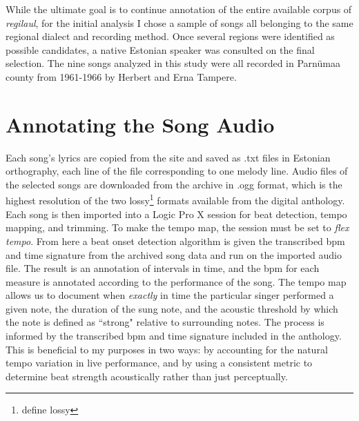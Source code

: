 While the ultimate goal is to continue annotation of the entire available corpus of {\it regilaul}, for the initial analysis I chose a sample of songs all belonging to the same regional dialect and recording method. Once several regions were identified as possible candidates, a native Estonian speaker was consulted on the final selection. The nine songs analyzed in this study were all recorded in Parnümaa county from 1961-1966 by Herbert and Erna Tampere. 


\section{Annotating the Song Audio }



 Each song's lyrics are copied from the site and saved as .txt files in Estonian orthography, each line of the file corresponding to one melody line.  
Audio files of the selected songs are downloaded from the archive in .ogg format, which is the highest resolution of the two lossy\footnote{define lossy} formats available from the digital anthology. Each song is then imported into a Logic Pro X \citep{b131156} session for beat detection, tempo mapping, and trimming. 
To make the tempo map, the session must be set to {\it flex tempo}. From here a beat onset detection algorithm \citep{robertsonBKeeperBeattrackerLive2007} is  given the transcribed bpm and time signature from the archived song data and run on the imported audio file. The result is an annotation of intervals in time, and the bpm for each measure is annotated according to the performance of the song.
The tempo map allows us to document when {\it exactly} in time the particular singer performed a given note, the duration of the sung note, and the acoustic threshold by which the note is defined as ``strong" relative to surrounding notes. The process is informed by the transcribed bpm and time signature included in the anthology. This is beneficial to my purposes in two ways: by accounting for the natural tempo variation in live performance, and by using a consistent metric to determine beat strength acoustically rather than just perceptually.

